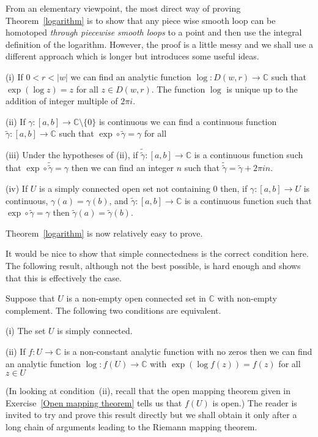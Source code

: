 From an elementary viewpoint, the most direct 
way of proving Theorem~\ref{logarithm} is to show
that any piece wise smooth loop can be homotoped
\emph{through piecewise smooth loops} to
a point and then use the integral definition of 
the logarithm. However, the proof is a little
messy and we shall use a different approach
which is longer but introduces some useful ideas.
\begin{theorem}\label{logarithm exists}
(i) If  $0<r<|w|$
we can find an analytic function 
$\log:D(w,r)\rightarrow{\mathbb C}$
such that $\exp(\log z)=z$ for all $z\in D(w,r)$. The
function $\log$ is unique up to the addition of
integer multiple of $2\pi i$.
 
(ii) If $\gamma:[a,b]\rightarrow{\mathbb C}\setminus\{0\}$
is continuous we can find a continuous function
$\tilde{\gamma}:[a,b]\rightarrow{\mathbb C}$
such that $\exp\circ\tilde{\gamma}=\gamma$ for all

(iii) Under the hypotheses of (ii), if 
$\tilde{\tilde{\gamma}}:[a,b]\rightarrow{\mathbb C}$
is a continuous function such that 
$\exp\circ\tilde{\tilde{\gamma}}=\gamma$
then we can find an integer $n$ such that
$\tilde{\tilde{\gamma}}=\tilde{\gamma}+2\pi i n$.

(iv) If $U$ is a simply connected open set
not containing $0$ then, if 
$\gamma:[a,b]\rightarrow U$ is continuous, 
$\gamma(a)=\gamma(b)$, 
and $\tilde{\gamma}:[a,b]\rightarrow{\mathbb C}$
is a continuous function such that  
$\exp\circ\tilde{\gamma}=\gamma$
then $\tilde{\gamma}(a)=\tilde{\gamma}(b)$.
\end{theorem}
Theorem~\ref{logarithm} is now relatively easy to prove.

It would be nice to show that simple connectedness is
the correct condition here.
The following result, although not the best possible,
is hard enough and shows that this is effectively the case.
\begin{lemma}\label{logarithm exact}
Suppose that $U$ is a  non-empty open connected
set in ${\mathbb C}$ with non-empty complement.
The following two conditions are equivalent.

(i) The set $U$ is simply connected.

(ii) If $f:U\rightarrow{\mathbb C}$ is a 
non-constant analytic
function with no zeros 
then we can find an analytic function 
$\log:f(U)\rightarrow{\mathbb C}$
with $\exp(\log f(z))=f(z)$ for all $z\in U$
\end{lemma}
(In looking at condition~(ii), recall that the open mapping
theorem given in Exercise~\ref{Open mapping theorem}
tells us that $f(U)$ is open.)
The reader is invited to try and prove this result 
directly but
we shall obtain it only after a long chain of arguments
leading to the Riemann mapping theorem.

